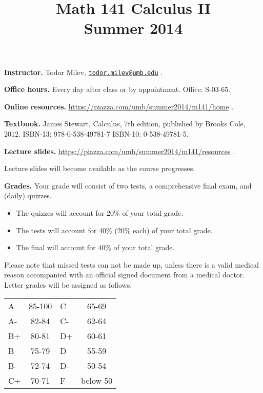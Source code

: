 \documentclass{article}
\title{Math 141 Calculus II \\ Summer 2014}
\begin{document}
\maketitle

\noindent \textbf{Instructor.} Todor Milev, \href{mailto:todor.milev@umb.edu}{\nolinkurl{todor.milev@umb.edu}} \quad \quad \quad .

\medskip
\noindent \textbf{Office hours. } Every day after class or by appointment. Office: S-03-65.

\medskip
\noindent \textbf{Online resources. }  \url{https://piazza.com/umb/summer2014/m141/home}  \quad \quad \quad .


\medskip\noindent \textbf{Textbook. }  James Stewart, Calculus, 7th edition, published by Brooks Cole, 2012. ISBN-13: 978-0-538-49781-7
ISBN-10: 0-538-49781-5.

\medskip \noindent \textbf{Lecture slides. }  \url{https://piazza.com/umb/summer2014/m141/resources} \quad \quad \quad .

\medskip\noindent Lecture slides will become available as the course progresses.



\medskip
\noindent \textbf{Grades.} Your grade will consist of two tests, a comprehensive final exam, and (daily) quizzes. 
\begin{itemize}
\item The quizzes will account for 20\% of your total grade.
\item The tests will account for 40\% (20\% each) of your total grade.
\item The final will account for 40\% of your total grade.
\end{itemize}
Please note that missed tests can not be made up, unless there is a valid medical reason accompanied with an official signed document from a medical doctor. Letter grades will be assigned as follows. 

\begin{center}
\begin{tabular}{lc|lc}
A & 85-100 & C & 65-69 \\
A-& 82-84 & C- & 62-64 \\
B+& 80-81 & D+ & 60-61 \\
B & 75-79& D & 55-59\\
B-& 72-74& D- & 50-54\\
C+& 70-71& F & below 50\\
\end{tabular}

\end{center}
\end{document}
